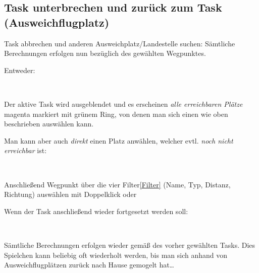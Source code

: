 \subsection{Task unterbrechen und zurück zum Task (Ausweichflugplatz)}
Task abbrechen und anderen Ausweichplatz/Landestelle suchen:
Sämtliche Berechnungen  erfolgen nun bezüglich des gewählten Wegpunktes.

Entweder:
\begin{center}
\blink~\blink~ \bblitz
\end{center}
Der aktive Task wird ausgeblendet und es erscheinen \textsl{alle erreichbaren Plätze} magenta markiert mit grünem Ring, von denen man sich einen wie oben beschrieben auswählen kann.

Man kann aber auch \textsl{direkt} einen Platz anwählen, welcher evtl. \textsl{noch nicht erreichbar} ist:
\begin{center}
\blink~\blink~ \bblitz
\end{center}
Anschließend Wegpunkt über die vier Filter\ref{Filter} (Name, Typ, Distanz, Richtung) auswählen mit Doppelklick oder  \blink~

Wenn der Task anschließend wieder fortgesetzt werden soll:
\begin{center}
 \blink~ \blink~ \bblitz
\end{center}
Sämtliche Berechnungen erfolgen wieder gemäß des vorher gewählten Tasks.
Dies Spielchen kann beliebig oft wiederholt werden, bis man sich anhand von
Ausweichflugplätzen zurück nach  Hause gemogelt hat\dots
